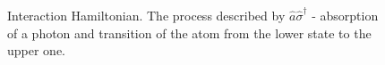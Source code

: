 \begin{figure}
\centering



\caption{Interaction Hamiltonian. The process described by $\hat{a}\hat{\sigma}^{\dag}$ - absorption
  of a photon and transition of the atom from the lower state to the upper one.}
\label{figPart1Ch2_2_2}
\end{figure}